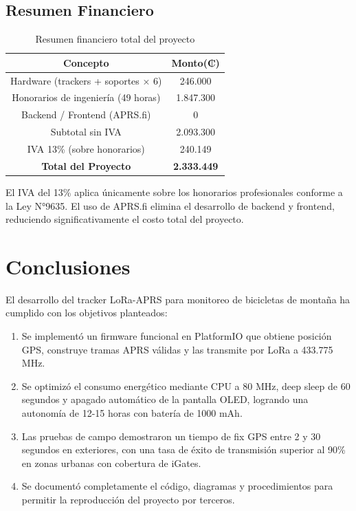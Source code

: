\documentclass[conference]{IEEEtran}
\begin{document}
\subsection{Resumen Financiero}

\begin{table}[H]
    \centering
    \caption{Resumen financiero total del proyecto}
    \begin{tabular}{|c|c|}
        \hline
        \textbf{Concepto} & \textbf{Monto(₡)} \\
        \hline
        Hardware (trackers + soportes × 6) & 246.000 \\
        Honorarios de ingeniería (49 horas) & 1.847.300 \\
        Backend / Frontend (APRS.fi) & 0 \\
        \hline
        Subtotal sin IVA & 2.093.300 \\
        IVA 13\% (sobre honorarios) & 240.149 \\
        \hline
        \textbf{Total del Proyecto} & \textbf{2.333.449} \\
        \hline
    \end{tabular}
    
    \label{tab:resumen}
\end{table}

El IVA del 13\% aplica únicamente sobre los honorarios profesionales conforme a la Ley N°9635. El uso de APRS.fi elimina el desarrollo de backend y frontend, reduciendo significativamente el costo total del proyecto.

\section{Conclusiones}

El desarrollo del tracker LoRa-APRS para monitoreo de bicicletas de montaña ha cumplido con los objetivos planteados:

\begin{enumerate}
    \item Se implementó un firmware funcional en PlatformIO que obtiene posición GPS, construye tramas APRS válidas y las transmite por LoRa a 433.775 MHz.
    
    \item Se optimizó el consumo energético mediante CPU a 80 MHz, deep sleep de 60 segundos y apagado automático de la pantalla OLED, logrando una autonomía de 12-15 horas con batería de 1000 mAh.
    
    \item Las pruebas de campo demostraron un tiempo de fix GPS entre 2 y 30 segundos en exteriores, con una tasa de éxito de transmisión superior al 90\% en zonas urbanas con cobertura de iGates.
    
    \item Se documentó completamente el código, diagramas y procedimientos para permitir la reproducción del proyecto por terceros.
\end{enumerate}
\end{document}
